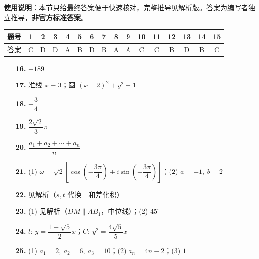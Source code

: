 
\begin{gknotice}
\textbf{使用说明}：本节只给最终答案便于快速核对，完整推导见解析版。答案为编写者独立推导，\textbf{非官方标准答案}。
\end{gknotice}

\begin{center}\begin{tabular}{cccccccccccccccc}
\toprule
题号 & 1 & 2 & 3 & 4 & 5 & 6 & 7 & 8 & 9 & 10 & 11 & 12 & 13 & 14 & 15 \\
\midrule
答案 & C & D & D & A & B & D & B & A & A & C & C & B & D & B & C \\
\bottomrule
\end{tabular}\end{center}

\begin{itemize}[leftmargin=2.6em]
  \item[\textbf{16.}] \(-189\)
  \item[\textbf{17.}] 准线 \(x=3\)；圆 \((x-2)^2+y^2=1\)
  \item[\textbf{18.}] \(-\dfrac34\)
  \item[\textbf{19.}] \(\dfrac{2\sqrt2}{3}\pi\)
  \item[\textbf{20.}] \(\dfrac{a_1+a_2+\cdots+a_n}{n}\)
\end{itemize}

\begin{itemize}[leftmargin=2.6em]
  \item[\textbf{21.}] (1) \(\omega=\sqrt2\left[\cos\left(-\dfrac{3\pi}{4}\right)+i\sin\left(-\dfrac{3\pi}{4}\right)\right]\)；(2) \(a=-1,\ b=2\)
  \item[\textbf{22.}] 见解析（\(s,t\) 代换＋和差化积）
  \item[\textbf{23.}] (1) 见解析（\(DM\parallel AB_1\)，中位线）；(2) \(45^\circ\)
  \item[\textbf{24.}] \(l:\ y=\dfrac{1+\sqrt5}{2}x\)；\(C:\ y^2=\dfrac{4\sqrt5}{5}x\)
  \item[\textbf{25.}] (1) \(a_1=2,\ a_2=6,\ a_3=10\)；(2) \(a_n=4n-2\)；(3) \(1\)
\end{itemize}
